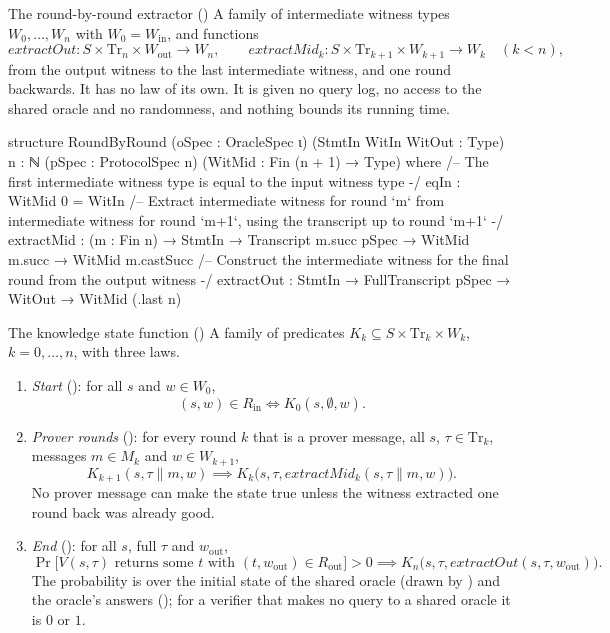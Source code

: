 \begin{define}{The round-by-round extractor ()}
A family of intermediate witness types $W_0, \dots, W_n$ with $W_0 = W_{\mathrm{in}}$, and
functions
\[
  \mathit{extractOut} : S \times \mathrm{Tr}_n \times W_{\mathrm{out}} \to W_n,
  \qquad
  \mathit{extractMid}_k : S \times \mathrm{Tr}_{k+1} \times W_{k+1} \to W_k
  \quad (k < n),
\]
from the output witness to the last intermediate witness, and one round backwards. It has no law
of its own. It is given no query log, no access to the shared oracle and no randomness, and
nothing bounds its running time.
\end{define}

\begin{leancode}
structure RoundByRound
    (oSpec : OracleSpec ι) (StmtIn WitIn WitOut : Type) {n : ℕ} (pSpec : ProtocolSpec n)
    (WitMid : Fin (n + 1) → Type) where
  /-- The first intermediate witness type is equal to the input witness type -/
  eqIn : WitMid 0 = WitIn
  /-- Extract intermediate witness for round `m` from intermediate witness for round `m+1`,
    using the transcript up to round `m+1` -/
  extractMid : (m : Fin n) → StmtIn → Transcript m.succ pSpec → WitMid m.succ → WitMid m.castSucc
  /-- Construct the intermediate witness for the final round from the output witness -/
  extractOut : StmtIn → FullTranscript pSpec → WitOut → WitMid (.last n)
\end{leancode}


\begin{define}{The knowledge state function (\allowbreak{})}
A family of predicates $K_k \subseteq S \times \mathrm{Tr}_k \times W_k$, $k = 0, \dots, n$, with
three laws.
\begin{enumerate}
\item \emph{Start} (): for all $s$ and $w \in W_0$,
  \[ (s, w) \in R_{\mathrm{in}} \iff K_0(s, \emptyset, w). \]
\item \emph{Prover rounds} (): for every round $k$ that is a prover message, all
  $s$, $\tau \in \mathrm{Tr}_k$, messages $m \in M_k$ and $w \in W_{k+1}$,
  \[ K_{k+1}(s, \tau \| m, w) \implies K_k\bigl(s, \tau, \mathit{extractMid}_k(s, \tau\|m, w)\bigr). \]
  No prover message can make the state true unless the witness extracted one round back was
  already good.
\item \emph{End} (): for all $s$, full $\tau$ and $w_{\mathrm{out}}$,
  \[ \Pr\bigl[V(s,\tau) \text{ returns some } t \text{ with } (t, w_{\mathrm{out}}) \in R_{\mathrm{out}}\bigr] > 0
     \implies K_n\bigl(s, \tau, \mathit{extractOut}(s, \tau, w_{\mathrm{out}})\bigr). \]
  The probability is over the initial state of the shared oracle (drawn by ) and the
  oracle's answers (); for a verifier that makes no query to a shared oracle it is $0$
  or $1$.
\end{enumerate}
\end{define}

